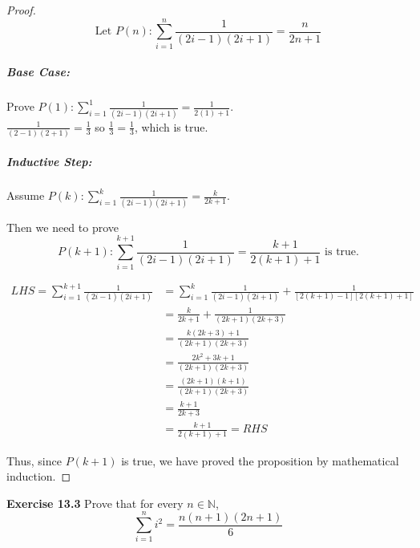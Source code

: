 \documentclass[12pt,oneside]{article}
\newenvironment{exercise}[1]{\vspace{.1in}\noindent\textbf{Exercise #1 \hspace{.05em}}}{}
\newcommand{\N}{\mathbb{N}}
\begin{document}
\begin{proof}
\begin{equation*}
\text{Let~} P(n): \sum_{i=1}^n \frac{1}{(2i-1)(2i+1)} = \frac{n}{2n+1}
\end{equation*}

\subparagraph*{Base Case:}
Prove $P(1): \sum_{i=1}^1 \frac{1}{(2i-1)(2i+1)} = \frac{1}{2(1)+1}$.\\
$\frac{1}{(2-1)(2+1)} = \frac{1}{3}$ so $\frac{1}{3} = \frac{1}{3}$, which is true.

\subparagraph*{Inductive Step:}
Assume $P(k): \sum_{i=1}^k \frac{1}{(2i-1)(2i+1)} = \frac{k}{2k+1}$.

Then we need to prove 
\begin{equation*}
P(k+1): \sum_{i=1}^{k+1} \frac{1}{(2i-1)(2i+1)} = \frac{k+1}{2(k+1)+1} \text{~is true.}
\end{equation*}

\begin{align*}
\textit{LHS} = \sum_{i=1}^{k+1} \frac{1}{(2i-1)(2i+1)} &= \sum_{i=1}^k \frac{1}{(2i-1)(2i+1)} + \frac{1}{[2(k+1)-1][2(k+1)+1]} \\
&= \frac{k}{2k+1} + \frac{1}{(2k+1)(2k+3)} \\
&= \frac{k(2k+3)+1}{(2k+1)(2k+3)}\\
&= \frac{2k^2+3k+1}{(2k+1)(2k+3)}\\
&= \frac{(2k+1)(k+1)}{(2k+1)(2k+3)}\\
&= \frac{k+1}{2k+3}\\
&= \frac{k+1}{2(k+1)+1} = \textit{RHS}
\end{align*}

Thus, since $P(k+1)$ is true, we have proved the proposition by mathematical induction.
\end{proof}

\begin{exercise}{13.3}
Prove that for every $n \in \N$,
\begin{equation*}
\sum_{i=1}^n i^2 = \frac{n(n+1)(2n+1)}{6}
\end{equation*}
\end{exercise}
\end{document}
